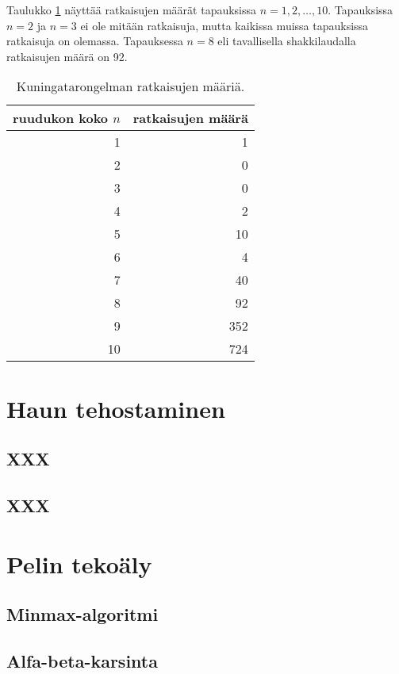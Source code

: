 Taulukko \ref{tab:kuning} näyttää ratkaisujen määrät
tapauksissa $n=1,2,\dots,10$.
Tapauksissa $n=2$ ja $n=3$ ei ole mitään ratkaisuja,
mutta kaikissa muissa tapauksissa ratkaisuja on olemassa.
Tapauksessa $n=8$ eli tavallisella shakkilaudalla
ratkaisujen määrä on 92.

\begin{table}
\center
\begin{tabular}{rr}
ruudukon koko $n$ & ratkaisujen määrä \\
\hline
1 & 1 \\
2 & 0 \\
3 & 0 \\
4 & 2 \\
5 & 10 \\
6 & 4 \\
7 & 40 \\
8 & 92 \\
9 & 352 \\
10 & 724 \\
\end{tabular}
\caption{Kuningatarongelman ratkaisujen määriä.}
\label{tab:kuning}
\end{table}

\section{Haun tehostaminen}

\subsection{XXX}

\subsection{XXX}

\section{Pelin tekoäly}

\subsection{Minmax-algoritmi}

\subsection{Alfa-beta-karsinta}


